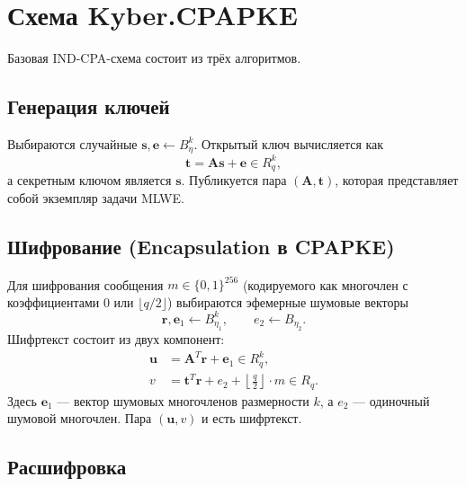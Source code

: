 \documentclass[11pt,a4paper]{article}
\begin{document}
\newpage
\section{Схема Kyber.CPAPKE}

Базовая IND-CPA-схема состоит из трёх алгоритмов.

\subsection{Генерация ключей}

Выбираются случайные \(\mathbf{s}, \mathbf{e} \leftarrow B_\eta^k\). Открытый ключ вычисляется как
\[
    \mathbf{t} = \mathbf{A}\mathbf{s} + \mathbf{e} \in R_q^k,
\]
а секретным ключом является \(\mathbf{s}\). Публикуется пара \((\mathbf{A}, \mathbf{t})\), которая представляет собой экземпляр задачи MLWE.

\subsection{Шифрование (Encapsulation в CPAPKE)}

Для шифрования сообщения \(m \in \{0,1\}^{256}\) (кодируемого как многочлен с коэффициентами \(0\) или \(\lfloor q/2 \rfloor\)) выбираются эфемерные шумовые векторы
\[
    \mathbf{r}, \mathbf{e}_1 \leftarrow B_{\eta_1}^k, \qquad e_2 \leftarrow B_{\eta_2}.
\]
Шифртекст состоит из двух компонент:
\begin{align}
    \mathbf{u} & = \mathbf{A}^T \mathbf{r} + \mathbf{e}_1 \in R_q^k, \label{eq:u}                                       \\
    v          & = \mathbf{t}^T \mathbf{r} + e_2 + \left\lfloor \frac{q}{2} \right\rfloor \cdot m \in R_q. \label{eq:v}
\end{align}
Здесь \(\mathbf{e}_1\) — вектор шумовых многочленов размерности \(k\), а \(e_2\) — одиночный шумовой многочлен. Пара \((\mathbf{u}, v)\) и есть шифртекст.

\subsection{Расшифровка}
\end{document}
